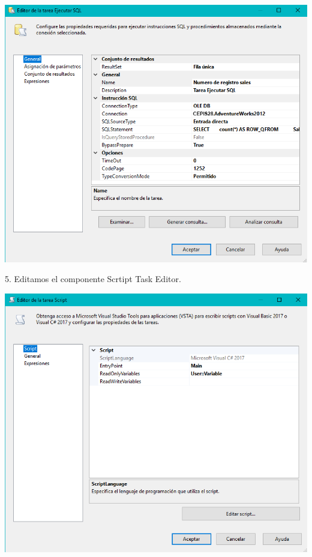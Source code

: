 	\begin{center}
	\includegraphics[width=\columnwidth]{images/task2/img20}
	\end{center}	
	

5. Editamos el componente Scrtipt Task Editor.
    \begin{center}
	\includegraphics[width=\columnwidth]{images/task2/img21}
    \end{center}	
    
